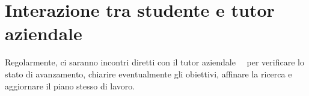 \section*{Interazione tra studente e tutor aziendale}

Regolarmente,  ci saranno incontri diretti con il tutor aziendale \nomeTutorAziendale\ \cognomeTutorAziendale\ per verificare lo stato di avanzamento, chiarire eventualmente gli obiettivi, affinare la ricerca e aggiornare il piano stesso di lavoro.
